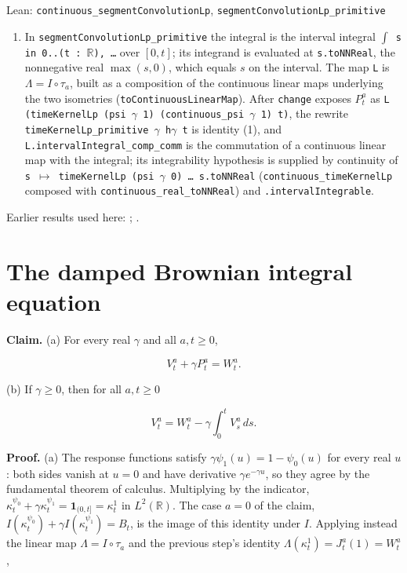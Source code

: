 \documentclass[11pt,a4paper]{article}
\begin{document}
\begin{leanbox}{Lean: \texttt{continuous\_\allowbreak{}segmentConvolutionLp}, \texttt{segmentConvolutionLp\_\allowbreak{}primitive}}
\begin{enumerate}
\item In \texttt{segment\allowbreak{}Convolution\allowbreak{}Lp\_\allowbreak{}primitive} the integral is the interval integral \texttt{\ensuremath{\int} s in 0.\allowbreak{}.\allowbreak{}(t : \ensuremath{\mathbb R}), …} over \([0,t]\); its integrand is evaluated at \texttt{s.\allowbreak{}to\allowbreak{}NNReal}, the nonnegative real \(\max(s,0)\), which equals \(s\) on the interval. The map \texttt{L} is \(\Lambda=I\circ\tau_a\), built as a composition of the continuous linear maps underlying the two isometries (\texttt{to\allowbreak{}Continuous\allowbreak{}Linear\allowbreak{}Map}). After \texttt{change} exposes \(P^a_t\) as \texttt{L (time\allowbreak{}Kernel\allowbreak{}Lp (psi \ensuremath{\gamma} 1) (continuous\_\allowbreak{}psi \ensuremath{\gamma} 1) t)}, the rewrite \texttt{time\allowbreak{}Kernel\allowbreak{}Lp\_\allowbreak{}primitive \ensuremath{\gamma} h\ensuremath{\gamma} t} is identity (1), and \texttt{L.\allowbreak{}interval\allowbreak{}Integral\_\allowbreak{}comp\_\allowbreak{}comm} is the commutation of a continuous linear map with the integral; its integrability hypothesis is supplied by continuity of \texttt{s \ensuremath{\mapsto} time\allowbreak{}Kernel\allowbreak{}Lp (psi \ensuremath{\gamma} 0) … s.\allowbreak{}to\allowbreak{}NNReal} (\texttt{continuous\_\allowbreak{}time\allowbreak{}Kernel\allowbreak{}Lp} composed with \texttt{continuous\_\allowbreak{}real\_\allowbreak{}to\allowbreak{}NNReal}) and \texttt{.\allowbreak{}interval\allowbreak{}Integrable}.

\end{enumerate}
\end{leanbox}


Earlier results used here: \cite[Section~3.6.12]{LangevinLean2026ULASC}; \cite[Section~3.8.5]{LangevinLean2026ULASC}.

\section{\texorpdfstring{The damped Brownian integral equation}{The damped Brownian integral equation}}


\textbf{Claim.} (a) For every real \(\gamma\) and all \(a,t\ge0\),


\[V^a_t+\gamma P^a_t=W^a_t .\]


(b) If \(\gamma\ge0\), then for all \(a,t\ge0\)


\[V^a_t=W^a_t-\gamma\int_0^tV^a_s\,ds .\]


\textbf{Proof.} (a) The response functions satisfy \(\gamma\psi_1(u)=1-\psi_0(u)\) for every real \(u\): both sides vanish at \(u=0\) and have derivative \(\gamma e^{-\gamma u}\), so they agree by the fundamental theorem of calculus. Multiplying by the indicator, \(\kappa^{\psi_0}_t+\gamma\kappa^{\psi_1}_t=\mathbf 1_{(0,t]}=\kappa^1_t\) in \(L^2(\mathbb R)\). The case \(a=0\) of the claim, \(I(\kappa^{\psi_0}_t)+\gamma I(\kappa^{\psi_1}_t)=B_t\), is the image of this identity under \(I\). Applying instead the linear map \(\Lambda=I\circ\tau_a\) and the previous step's identity \(\Lambda(\kappa^1_t)=J^a_t(1)=W^a_t\),
\end{document}
